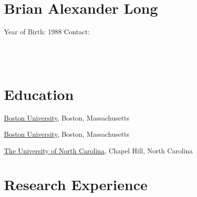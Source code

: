 %



\doublespacing

\setlength{\parindent}{0cm}


\section*{Brian Alexander Long}


Year of Birth: 1988 \newline
Contact: \\
\\
\\
\\



\section*{Education}

\href{http://buphy.bu.edu/}{Boston University}, Boston, Massachusetts \newline
{}

\href{http://www.buphy.bu.edu/}{Boston University}, Boston, Massachusetts \newline
{}

\href{http://www.physics.unc.edu/}{The University of North Carolina}, Chapel Hill, North Carolina \newline
{}




\section*{Research Experience}

